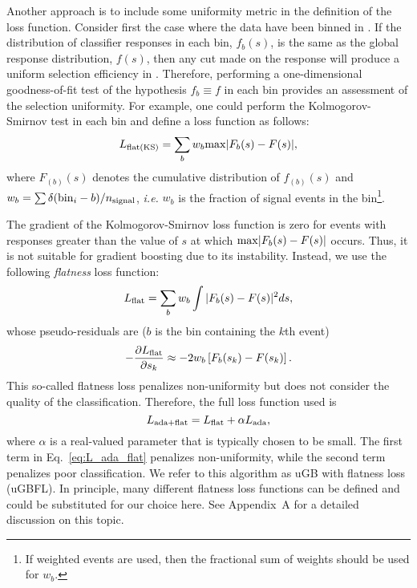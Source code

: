 Another approach is to include some uniformity metric in the definition of the loss function.  Consider first the case where the data have been binned in \y.  If the distribution of classifier responses in each bin, $f_b(s)$, is the same as the global response distribution, $f(s)$, then any cut made on the response will produce a uniform selection efficiency in \y.  Therefore, performing a one-dimensional goodness-of-fit test of the hypothesis $f_b \equiv f$ in each bin provides an assessment of the selection uniformity.  
For example, one could perform the Kolmogorov-Smirnov test in each bin and define a loss function as follows:
\begin{equation}
  L_{\rm flat(KS)} = \sum\limits_{b} w_b {\rm max}|F_b(s)-F(s)|,
\end{equation}
where $F_{(b)}(s)$ denotes the cumulative distribution of $f_{(b)}(s)$ and $w_b = \sum \delta({\rm bin}_i - b)/n_{\rm signal}$, {\em i.e.} $w_b$ is the fraction of signal events in the bin\footnote{If weighted events are used, then the fractional sum of weights should be used for $w_b$.}.   

The gradient of the Kolmogorov-Smirnov loss function is zero for events with responses greater than the value of $s$ at which ${\rm max}|F_b(s)-F(s)|$ occurs.  Thus, it is not suitable for gradient boosting due to its instability.  Instead, we use the following {\em flatness} loss function:
\begin{equation}
  L_{\rm flat} = \sum\limits_{b} w_b \int |F_b(s)-F(s)|^2 ds,
\end{equation}
whose pseudo-residuals are ($b$ is the bin containing the $k$th event)
\begin{equation}
 -\frac{\partial L_{\rm flat}}{\partial s_k} \approx - 2 w_b \left[F_b(s_k)-F(s_k)\right] .
\end{equation}
This so-called flatness loss penalizes non-uniformity but does not consider the quality of the classification.  Therefore, the full loss function used is 
\begin{equation}
\label{eq:L_ada_flat}
  L_{{\rm ada}+{\rm flat}} = L_{\rm flat} + \alpha L_{\rm ada},
\end{equation}  
where $\alpha$ is a real-valued parameter that is typically chosen to be small.  The first term in Eq.~\ref{eq:L_ada_flat} penalizes non-uniformity, while the second term penalizes poor classification.  
We refer to this algorithm as uGB with flatness loss (uGBFL). 
In principle, many different flatness loss functions can be defined and could be substituted for our choice here.  See Appendix~A for a detailed discussion on this topic. 

